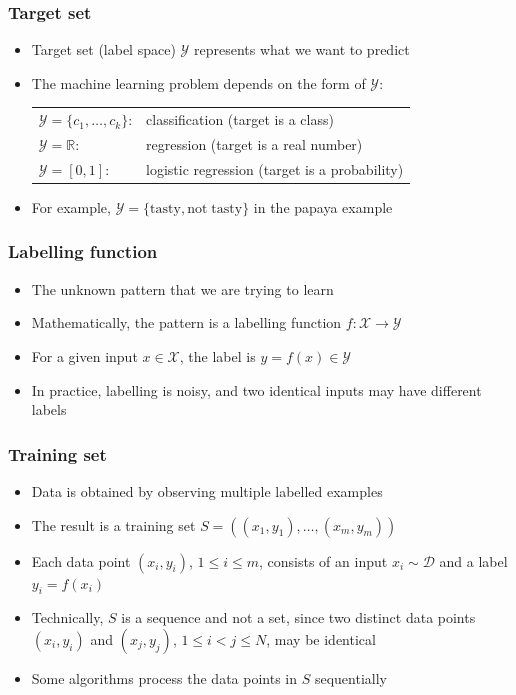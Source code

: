 \documentclass[10pt]{beamer}
\begin{document}
\begin{frame}
  \frametitle{Target set}
  \begin{itemize}
	\item Target set (label space) $\mathcal{Y}$ represents what we want to {\color{blue} predict}
	\item The machine learning problem depends on the form of $\mathcal{Y}$:\\

	\vspace*{0.3cm}

	\begin{tabular}{ll}
		$\mathcal{Y}=\{c_1,\ldots,c_k\}$: & {\color{red} classification} (target is a class)\\
		$\mathcal{Y}=\mathbb{R}$: & {\color{red} regression} (target is a real number)\\
		$\mathcal{Y}=[0,1]$: & {\color{red} logistic regression} (target is a probability)
	\end{tabular}
	\vspace*{0.3cm}
	\item For example, $\mathcal{Y}=\{\mathrm{tasty},\mathrm{not\;tasty}\}$ in the papaya example
  \end{itemize}
\end{frame}

\begin{frame}
  \frametitle{Labelling function}
  \begin{itemize}
	\item The unknown {\color{red} pattern} that we are trying to learn
	\item Mathematically, the pattern is a {\color{blue} labelling function} $f:\mathcal{X} \rightarrow \mathcal{Y}$
	\item For a given input $x\in\mathcal{X}$, the label is $y=f(x)\in\mathcal{Y}$
	\item In practice, labelling is noisy, and two identical inputs may have different labels
  \end{itemize}
\end{frame}

\begin{frame}
  \frametitle{Training set}
  \begin{itemize}
	\item Data is obtained by observing multiple labelled examples
	\item The result is a {\color{red} training set} $S=((x_1,y_1),\ldots,(x_m,y_m))$
	\item Each data point $(x_i,y_i)$, $1\leq i\leq m$, consists of an input $x_i\sim\mathcal{D}$ and a label $y_i=f(x_i)$
	\item Technically, $S$ is a {\color{green} sequence} and not a set, since two distinct data points $(x_i,y_i)$ and $(x_j,y_j)$, $1\leq i<j\leq N$, may be identical
	\item Some algorithms process the data points in $S$ sequentially
  \end{itemize}
\end{frame}
\end{document}
